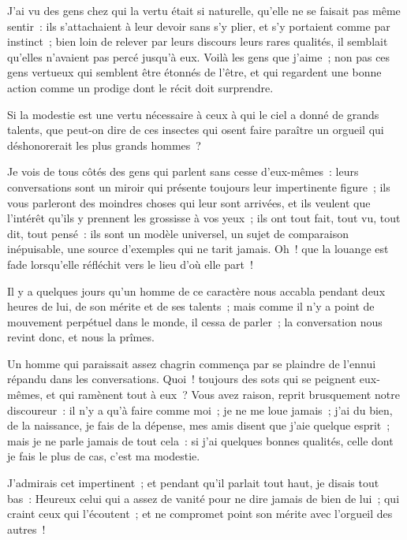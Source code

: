 \documentclass[french,twoside]{book} %
\newcommand{\dateline}[1]{\medskip{\RaggedLeft{#1}\par}\bigskip}
\begin{document}
\noindent J’ai vu des gens chez qui la vertu était si naturelle, qu’elle ne se faisait pas même sentir : ils s’attachaient à leur devoir sans s’y plier, et s’y portaient comme par instinct ; bien loin de relever par leurs discours leurs rares qualités, il semblait qu’elles n’avaient pas percé jusqu’à eux. Voilà les gens que j’aime ; non pas ces gens vertueux qui semblent être étonnés de l’être, et qui regardent une bonne action comme un prodige dont le récit doit surprendre.\par
Si la modestie est une vertu nécessaire à ceux à qui le ciel a donné de grands talents, que peut-on dire de ces insectes qui osent faire paraître un orgueil qui déshonorerait les plus grands hommes ?\par
Je vois de tous côtés des gens qui parlent sans cesse d’eux-mêmes : leurs conversations sont un miroir qui présente toujours leur impertinente figure ; ils vous parleront des moindres choses qui leur sont arrivées, et ils veulent que l’intérêt qu’ils y prennent les grossisse à vos yeux ; ils ont tout fait, tout vu, tout dit, tout pensé : ils sont un modèle universel, un sujet de comparaison inépuisable, une source d’exemples qui ne tarit jamais. Oh ! que la louange est fade lorsqu’elle réfléchit vers le lieu d’où elle part !\par
Il y a quelques jours qu’un homme de ce caractère nous accabla pendant deux heures de lui, de son mérite et de ses talents ; mais comme il n’y a point de mouvement perpétuel dans le monde, il cessa de parler ; la conversation nous revint donc, et nous la prîmes.\par
Un homme qui paraissait assez chagrin commença par se plaindre de l’ennui répandu dans les conversations. Quoi ! toujours des sots qui se peignent eux-mêmes, et qui ramènent tout à eux ? Vous avez raison, reprit brusquement notre discoureur : il n’y a qu’à faire comme moi ; je ne me loue jamais ; j’ai du bien, de la naissance, je fais de la dépense, mes amis disent que j’aie quelque esprit ; mais je ne parle jamais de tout cela : si j’ai quelques bonnes qualités, celle dont je fais le plus de cas, c’est ma modestie.\par
J’admirais cet impertinent ; et pendant qu’il parlait tout haut, je disais tout bas : Heureux celui qui a assez de vanité pour ne dire jamais de bien de lui ; qui craint ceux qui l’écoutent ; et ne compromet point son mérite avec l’orgueil des autres !\par

\dateline{À Paris, le 20 de la lune de Rhamazan, 1713.}
\end{document}
